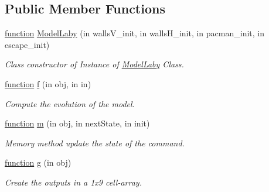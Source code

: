 \subsection*{Public Member Functions}
\begin{DoxyCompactItemize}
\item 
\hyperlink{_plan__desuma_functions_8m_ac2ffb26d6f42d3bbcd7847b0873403f4}{function} \hyperlink{class_model_laby_adefbf2299bfb17336cae5508d54443a8}{Model\+Laby} (in walls\+V\+\_\+init, in walls\+H\+\_\+init, in pacman\+\_\+init, in escape\+\_\+init)
\begin{DoxyCompactList}\small\item\em Class constructor of Instance of \hyperlink{class_model_laby}{Model\+Laby} Class. \end{DoxyCompactList}\item 
\hyperlink{_plan__desuma_functions_8m_ac2ffb26d6f42d3bbcd7847b0873403f4}{function} \hyperlink{class_model_laby_a6f3b146c92a207e95690d08975e1e072}{f} (in obj, in in)
\begin{DoxyCompactList}\small\item\em Compute the evolution of the model. \end{DoxyCompactList}\item 
\hyperlink{_plan__desuma_functions_8m_ac2ffb26d6f42d3bbcd7847b0873403f4}{function} \hyperlink{class_model_laby_a3140f24c6c4b80037b7d4f521c6ae2d3}{m} (in obj, in next\+State, in init)
\begin{DoxyCompactList}\small\item\em Memory method update the state of the command. \end{DoxyCompactList}\item 
\hyperlink{_plan__desuma_functions_8m_ac2ffb26d6f42d3bbcd7847b0873403f4}{function} \hyperlink{class_model_laby_a07dadfabe92bf9a144b8a862720e7746}{g} (in obj)
\begin{DoxyCompactList}\small\item\em Create the outputs in a 1x9 cell-\/array. \end{DoxyCompactList}\end{DoxyCompactItemize}
